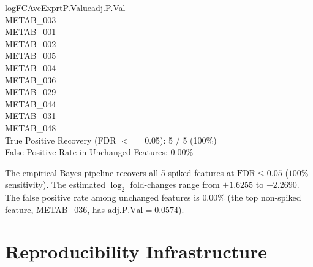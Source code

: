 \documentclass[11pt,twoside,openright]{book}
\begin{document}
\begin{routput}
\enspace\enspace\enspace\enspace\enspace\enspace\enspace\enspace\enspace\enspace\enspace\enspace logFC\enspace AveExpr\enspace\enspace\enspace\enspace\enspace\enspace t\enspace P.Value\enspace adj.P.Val\\
METAB\_003\enspace{}\enspace{}\enspace\enspace{}\\
METAB\_001\enspace{}\enspace{}\enspace\enspace{}\\
METAB\_002\enspace{}\enspace{}\enspace\enspace{}\\
METAB\_005\enspace{}\enspace{}\enspace\enspace{}\\
METAB\_004\enspace{}\enspace{}\enspace{}\enspace\enspace{}\\
METAB\_036\enspace{}\enspace{}\enspace{}\enspace\enspace{}\\
METAB\_029\enspace{}\enspace{}\enspace{}\enspace\enspace{}\\
METAB\_044\enspace{}\enspace\enspace{}\\
METAB\_031\enspace{}\enspace\enspace{}\\
METAB\_048\enspace{}\enspace\enspace{}\\[0.4em]
True Positive Recovery (FDR $<=$ 0.05): 5 / 5 (100\%)\\
False Positive Rate in Unchanged Features: 0.00\%
\end{routput}

The empirical Bayes pipeline recovers all 5 spiked features at $\text{FDR} \le 0.05$ ($100\%$ sensitivity). The estimated $\log_2$ fold-changes range from $+1.6255$ to $+2.2690$. The false positive rate among unchanged features is $0.00\%$ (the top non-spiked feature, METAB\_036, has $\text{adj.P.Val} = 0.0574$).

\FloatBarrier
\section{Reproducibility Infrastructure}
\label{sec:reproducibility}
\end{document}

